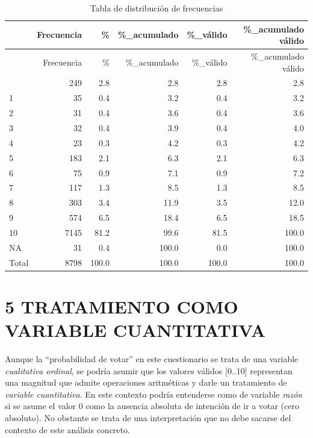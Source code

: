 \documentclass[
  12 pt,
  a4paper,
]{article}
\newenvironment{Shaded}{\begin{snugshade}}{\end{snugshade}}
\newcommand{\CommentTok}[1]{\textcolor[rgb]{0.56,0.35,0.01}{\textit{#1}}}
\begin{document}
\begin{longtable}[]{@{}lrrrrr@{}}
\caption{Tabla de distribución de frecuencias}\tabularnewline
\toprule\noalign{}
& Frecuencia & \% & \%\_acumulado & \%\_válido & \%\_acumulado válido \\
\midrule\noalign{}
\endfirsthead
\toprule\noalign{}
& Frecuencia & \% & \%\_acumulado & \%\_válido & \%\_acumulado válido \\
\midrule\noalign{}
\endhead
\bottomrule\noalign{}
\endlastfoot
0 & 249 & 2.8 & 2.8 & 2.8 & 2.8 \\
1 & 35 & 0.4 & 3.2 & 0.4 & 3.2 \\
2 & 31 & 0.4 & 3.6 & 0.4 & 3.6 \\
3 & 32 & 0.4 & 3.9 & 0.4 & 4.0 \\
4 & 23 & 0.3 & 4.2 & 0.3 & 4.2 \\
5 & 183 & 2.1 & 6.3 & 2.1 & 6.3 \\
6 & 75 & 0.9 & 7.1 & 0.9 & 7.2 \\
7 & 117 & 1.3 & 8.5 & 1.3 & 8.5 \\
8 & 303 & 3.4 & 11.9 & 3.5 & 12.0 \\
9 & 574 & 6.5 & 18.4 & 6.5 & 18.5 \\
10 & 7145 & 81.2 & 99.6 & 81.5 & 100.0 \\
NA & 31 & 0.4 & 100.0 & 0.0 & 100.0 \\
Total & 8798 & 100.0 & 100.0 & 100.0 & 100.0 \\
\end{longtable}

\begin{Shaded}
\end{Shaded}

\newpage

\hypertarget{tratamiento-como-variable-cuantitativa}{%
\section{5 TRATAMIENTO COMO VARIABLE
CUANTITATIVA}\label{tratamiento-como-variable-cuantitativa}}

Aunque la ``probabilidad de votar'' en este cuestionario se trata de una
variable \emph{cualitativa ordinal}, se podría asumir que los valores
válidos {[}0..10{]} representan una magnitud que admite operaciones
aritméticas y darle un tratamiento de \emph{variable cuantitativa}. En
este contexto podría entenderse como de variable \emph{razón} si se
asume el valor 0 como la ausencia absoluta de intención de ir a votar
(cero absoluto). No obstante se trata de una interpretación que no debe
sacarse del contexto de este análisis concreto.
\end{document}
